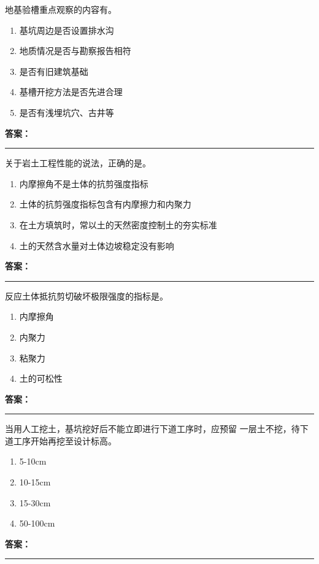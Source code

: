 \documentclass[UTF8,fontset=fandol,11pt]{ctexart}
\newcommand{\answerline}{\textcolor{answerred}{\rule{2.4cm}{0.7pt}}}
\begin{document}
\begin{quizbox}[title={第 27 题}]
地基验槽重点观察的内容有。\\
\begin{enumerate}[label=\Alph*.]
\item 基坑周边是否设置排水沟
\item 地质情况是否与勘察报告相符
\item 是否有旧建筑基础
\item 基槽开挖方法是否先进合理
\item 是否有浅埋坑穴、古井等
\end{enumerate}
\textbf{\textcolor{answerred}{答案：}} \answerline
\end{quizbox}

\begin{quizbox}[title={第 28 题}]
关于岩土工程性能的说法，正确的是。\\
\begin{enumerate}[label=\Alph*.]
\item 内摩擦角不是土体的抗剪强度指标
\item 土体的抗剪强度指标包含有内摩擦力和内聚力
\item 在土方填筑时，常以土的天然密度控制土的夯实标准
\item 土的天然含水量对土体边坡稳定没有影响
\end{enumerate}
\textbf{\textcolor{answerred}{答案：}} \answerline
\end{quizbox}

\begin{quizbox}[title={第 29 题}]
反应土体抵抗剪切破坏极限强度的指标是。\\
\begin{enumerate}[label=\Alph*.]
\item 内摩擦角
\item 内聚力
\item 粘聚力
\item 土的可松性
\end{enumerate}
\textbf{\textcolor{answerred}{答案：}} \answerline
\end{quizbox}

\begin{quizbox}[title={第 30 题}]
当用人工挖土，基坑挖好后不能立即进行下道工序时，应预留 一层土不挖，待下道工序开始再挖至设计标高。\\
\begin{enumerate}[label=\Alph*.]
\item 5-10cm
\item 10-15cm
\item 15-30cm
\item 50-100cm
\end{enumerate}
\textbf{\textcolor{answerred}{答案：}} \answerline
\end{quizbox}
\end{document}
